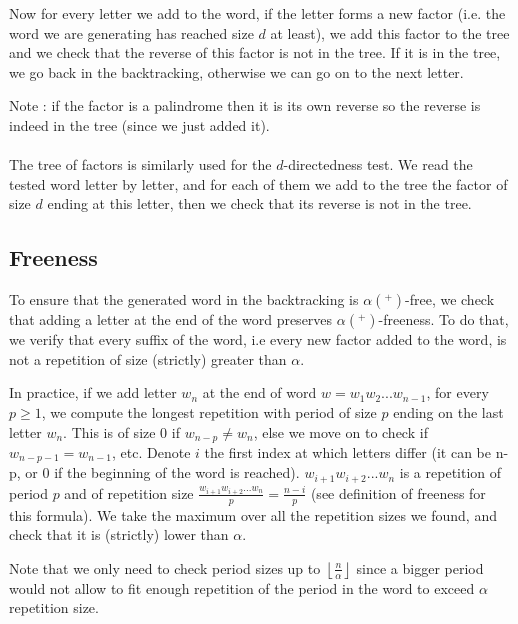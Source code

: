 \documentclass[a4paper]{article}
\theoremstyle{definition}
\begin{document}

Now for every letter we add to the word, if the letter forms a new factor (i.e. the word we are generating has reached size $d$ at least), we add this factor to the tree and we check that the reverse of this factor is not in the tree. If it is in the tree, we go back in the backtracking, otherwise we can go on to the next letter. 

Note : if the factor is a palindrome then it is its own reverse so the reverse is indeed in the tree (since we just added it).

\paragraph{}
The tree of factors is similarly used for the $d$-directedness test. We read the tested word letter by letter, and for each of them we add to the tree the factor of size $d$ ending at this letter, then we check that its reverse is not in the tree.

\subsection{Freeness}

To ensure that the generated word in the backtracking is $\alpha(^+)$-free, we check that adding a letter at the end of the word preserves $\alpha(^+)$-freeness. To do that, we verify that every suffix of the word, i.e every new factor added to the word, is not a repetition of size (strictly) greater than $\alpha$. 

In practice, if we add letter $w_n$ at the end of word $w=w_1w_2...w_{n-1}$, for every $p \ge 1$, we compute the longest repetition with period of size $p$ ending on the last letter $w_n$. This is of size 0 if $w_{n-p} \neq w_{n}$, else we move on to check if $w_{n-p-1} = w_{n-1}$, etc. Denote $i$ the first index at which letters differ (it can be n-p, or 0 if the beginning of the word is reached). $w_{i+1}w_{i+2}...w_{n}$ is a repetition of period $p$ and of repetition size $\frac{w_{i+1}w_{i+2}...w_{n}}{p} = \frac{n-i}{p}$ (see definition of freeness for this formula). We take the maximum over all the repetition sizes we found, and check that it is (strictly) lower than $\alpha$.

Note that we only need to check period sizes up to $\left\lfloor \frac{n}{\alpha} \right\rfloor$ since a bigger period would not allow to fit enough repetition of the period in the word to exceed $\alpha$ repetition size.
\end{document}
